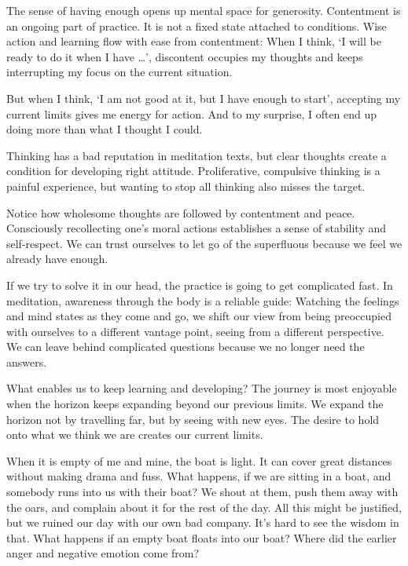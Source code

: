 The sense of having enough opens up mental space for generosity.
Contentment is an ongoing part of practice. It is not a fixed state
attached to conditions. Wise action and learning flow with ease from
contentment: When I think, `I will be ready to do it when I have
\ldots{}', discontent occupies my thoughts and keeps interrupting my
focus on the current situation.

\clearpage


But when I think, `I am not good at it, but I have enough to start',
accepting my current limits gives me energy for action. And to my
surprise, I often end up doing more than what I thought I could.

Thinking has a bad reputation in meditation texts, but clear thoughts
create a condition for developing right attitude. Proliferative,
compulsive thinking is a painful experience, but wanting to stop all
thinking also misses the target.

Notice how wholesome thoughts are followed by contentment and peace.
Consciously recollecting one's moral actions establishes a sense of
stability and self-respect. We can trust ourselves to let go of the
superfluous because we feel we already have enough.

If we try to solve it in our head, the practice is going to get
complicated fast. In meditation, awareness through the body is a
reliable guide: Watching the feelings and mind states as they come and
go, we shift our view from being preoccupied with ourselves to a
different vantage point, seeing from a different perspective. We can
leave behind complicated questions because we no longer need the
answers.


What enables us to keep learning and developing? The journey is most
enjoyable when the horizon keeps expanding beyond our previous limits.
We expand the horizon not by travelling far, but by seeing with new
eyes. The desire to hold onto what we think we are creates our current
limits.

When it is empty of me and mine, the boat is light. It can cover great
distances without making drama and fuss. What happens, if we are sitting
in a boat, and somebody runs into us with their boat? We shout at them,
push them away with the oars, and complain about it for the rest of the
day. All this might be justified, but we ruined our day with our own bad
company. It's hard to see the wisdom in that. What happens if an empty
boat floats into our boat? Where did the earlier anger and negative
emotion come from?

